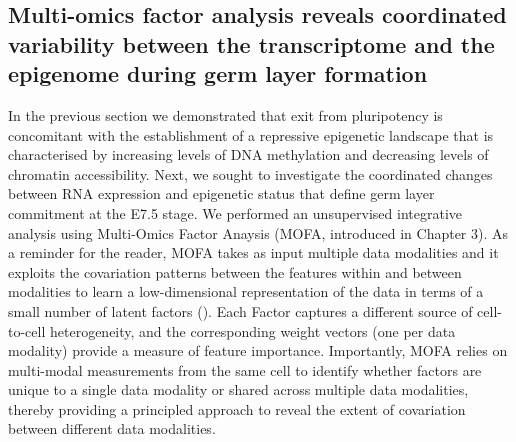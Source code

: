\subsection{Multi-omics factor analysis reveals coordinated variability between the transcriptome and the epigenome during germ layer formation} \label{section:mofa_gastrulation}

In the previous section we demonstrated that exit from pluripotency is concomitant with the establishment of a repressive epigenetic landscape that is characterised by increasing levels of DNA methylation and decreasing levels of chromatin accessibility. Next, we sought to investigate the coordinated changes between RNA expression and epigenetic status that define germ layer commitment at the E7.5 stage. We performed an unsupervised integrative analysis using Multi-Omics Factor Anaysis (MOFA, introduced in Chapter 3). As a reminder for the reader, MOFA takes as input multiple data modalities and it exploits the covariation patterns between the features within and between modalities to learn a low-dimensional representation of the data in terms of a small number of latent factors (). Each Factor captures a different source of cell-to-cell heterogeneity, and the corresponding weight vectors (one per data modality) provide a measure of feature importance. Importantly, MOFA relies on multi-modal measurements from the same cell to identify whether factors are unique to a single data modality or shared across multiple data modalities, thereby providing a principled approach to reveal the extent of covariation between different data modalities.


